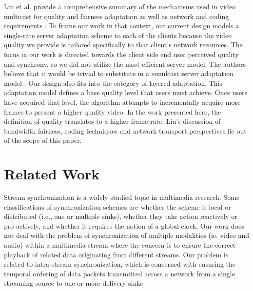 \documentclass{sig-alternate}
\begin{document}
Liu et al. provide a comprehensive summary of the mechanisms used in
video multicast for quality and fairness adaptation as well as network
and coding requirements \cite{LIU}.  To frame our work in that
context, our current design models a single-rate server adaptation
scheme to each of the clients because the video quality we provide is
tailored specifically to that client's network resources.  The focus
in our work is directed towards the client side end user perceived
quality and synchrony, so we did not utilize the most efficient server
model.  The authors believe that it would be trivial to substitute in
a simulcast server adaptation model \cite{simulcast}.  Our design also
fits into the category of layered adaptation.  This adaptation model
defines a base quality level that users must achieve.  Once users have
acquired that level, the algorithm attempts to incrementally acquire
more frames to present a higher quality video.  In the work presented
here, the definition of quality translates to a higher frame rate.
Liu's discussion of bandwidth fairness, coding techniques and network
transport perspectives lie out of the scope of this paper.

\section{Related Work} \label{related}

Stream synchronization is a widely studied topic in multimedia
research.  Some classifications of synchronization schemes are whether
the scheme is local or distributed (i.e., one or multiple sinks),
whether they take action reactively or pro-actively, and whether it
requires the notion of a global clock.  Our work does not deal with
the problem of synchronization of multiple modalities (ie. video and
audio) within a multimedia stream where the concern is to ensure the
correct playback of related data originating from different streams.
Our problem is related to intra-stream synchronization, which is
concerned with ensuring the temporal ordering of data packets
transmitted across a network from a single streaming source to one or
more delivery sinks
\end{document}

